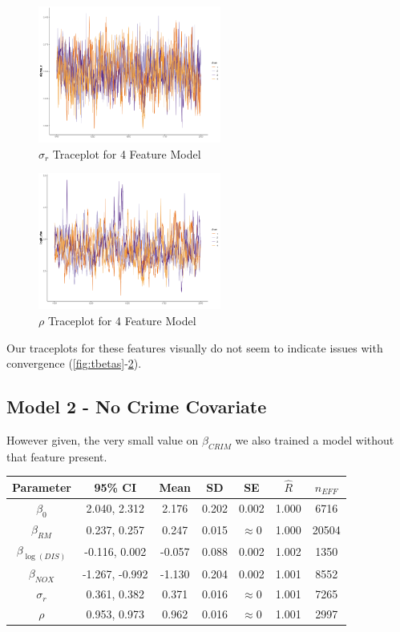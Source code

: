 \documentclass[11pt]{article}
\begin{document}
\begin{figure}[h!] 
	\centering
  \includegraphics[height=45mm]{traceplot_sigma_r.png}
  \caption{$\sigma_r$ Traceplot for 4 Feature Model}
  \label{fig:tsigma_r}
\end{figure}

\begin{figure}[h!] 
	\centering
  \includegraphics[height=45mm]{traceplot_logit_rho.png}
  \caption{$\rho$ Traceplot for 4 Feature Model}
  \label{fig:tlogit_rho}
\end{figure}

\FloatBarrier

Our traceplots for these features visually do not seem to indicate issues with convergence (\ref{fig:tbetas}-\ref{fig:tlogit_rho}). 

\newpage

\subsection{Model 2 - No Crime Covariate} \label{model2}

However given, the very small value on $\beta_{CRIM}$ we also trained a model without that feature present. 

\begin{center}
\begin{tabular}{ c  | c | c | c | c | c | c}
\hline
 Parameter & 95\% CI & Mean & SD & SE & $\hat{R}$ & $n_{EFF}$ \\ 
 \hline
 $\beta_0$ & 2.040,  2.312 & 2.176 & 0.202 & 0.002 & 1.000 & 6716 \\
 $\beta_{RM}$ & 0.237, 0.257 & 0.247 & 0.015 & $\approx 0$ & 1.000 & 20504 \\
 $\beta_{\log{(DIS)}}$ & -0.116, 0.002 & -0.057 & 0.088 & 0.002 & 1.002 & 1350 \\
 $\beta_{NOX}$ & -1.267, -0.992 & -1.130 & 0.204 & 0.002 & 1.001 & 8552 \\
 $\sigma_r$ & 0.361, 0.382 & 0.371 & 0.016 & $\approx 0$ & 1.001 & 7265 \\
 $\rho$ & 0.953, 0.973 & 0.962 & 0.016 & $\approx 0$ & 1.001 & 2997 \\
 \hline
\end{tabular}
\end{center}
\end{document}
